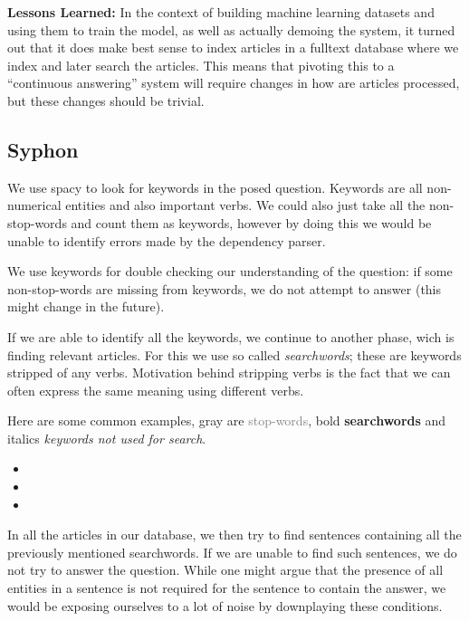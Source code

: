 \documentclass[11pt,a4paper]{article}
\begin{document}
\textbf{Lessons Learned:} In the context of building machine learning datasets and using them
to train the model, as well as actually demoing the system, it turned out
that it does make best sense to index articles in a fulltext database
where we index and later search the articles.  This means that pivoting
this to a ``continuous answering'' system will require changes in how are
articles processed, but these changes should be trivial.

\subsection{Syphon}

We use spacy to look for keywords in the posed question. Keywords are all non-numerical entities and also important verbs. We could also just take all the non-stop-words and count them as keywords, however by doing this we would be unable to identify errors made by the dependency parser. 

We use keywords for double checking our understanding of the question: if some non-stop-words are missing from keywords, we do not attempt to answer (this might change in the future).

If we are able to identify all the keywords, we continue to another phase, wich is finding relevant articles. For this we use so called \textit{searchwords}; these are keywords stripped of any verbs. Motivation behind stripping verbs is the fact that we can often express the same meaning using different verbs.

Here are some common examples, gray are \textcolor{gray}{stop-words}, bold \textbf{searchwords} and italics \textit{keywords not used for search}.

\begin{itemize}

\item {}    

\item {}     

\item {}     

\end{itemize}

In all the articles in our database, we then try to find sentences containing all the previously mentioned searchwords. If we are unable to find such sentences, we do not try to answer the question. While one might argue that the presence of all entities in a sentence is not required for the sentence to contain the answer, we would be exposing ourselves to a lot of noise by downplaying these conditions.
\end{document}
